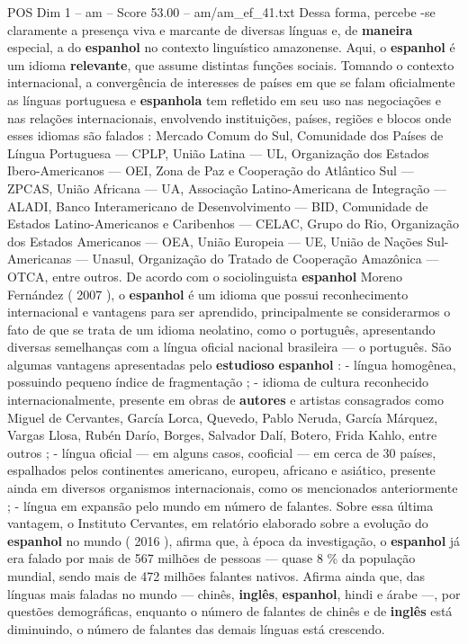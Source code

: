 \begin{textsample}{POS Dim 1 – am – Score 53.00 – am/am\_ef\_41.txt}
Dessa forma, percebe -se claramente a presença viva e marcante de diversas línguas e, de \textbf{maneira} especial, a do \textbf{espanhol} no contexto linguístico amazonense.
Aqui, o \textbf{espanhol} é um idioma \textbf{relevante}, que assume distintas funções sociais.
Tomando o contexto internacional, a convergência de interesses de países em que se falam oficialmente as línguas portuguesa e \textbf{espanhola} tem refletido em seu uso nas negociações e nas relações internacionais, envolvendo instituições, países, regiões e blocos onde esses idiomas são falados : Mercado Comum do Sul, Comunidade dos Países de Língua Portuguesa — CPLP, União Latina — UL, Organização dos Estados Ibero-Americanos — OEI, Zona de Paz e Cooperação do Atlântico Sul — ZPCAS, União Africana — UA, Associação Latino-Americana de Integração — ALADI, Banco Interamericano de Desenvolvimento — BID, Comunidade de Estados Latino-Americanos e Caribenhos — CELAC, Grupo do Rio, Organização dos Estados Americanos — OEA, União Europeia — UE, União de Nações Sul-Americanas — Unasul, Organização do Tratado de Cooperação Amazônica — OTCA, entre outros.
De acordo com o sociolinguista \textbf{espanhol} Moreno Fernández ( 2007 ), o \textbf{espanhol} é um idioma que possui reconhecimento internacional e vantagens para ser aprendido, principalmente se considerarmos o fato de que se trata de um idioma neolatino, como o português, apresentando diversas semelhanças com a língua oficial nacional brasileira — o português.
São algumas vantagens apresentadas pelo \textbf{estudioso} \textbf{espanhol} : - língua homogênea, possuindo pequeno índice de fragmentação ; - idioma de cultura reconhecido internacionalmente, presente em obras de \textbf{autores} e artistas consagrados como Miguel de Cervantes, García Lorca, Quevedo, Pablo Neruda, García Márquez, Vargas Llosa, Rubén Darío, Borges, Salvador Dalí, Botero, Frida Kahlo, entre outros ; - língua oficial — em alguns casos, cooficial — em cerca de 30 países, espalhados pelos continentes americano, europeu, africano e asiático, presente ainda em diversos organismos internacionais, como os mencionados anteriormente ; - língua em expansão pelo mundo em número de falantes.
Sobre essa última vantagem, o Instituto Cervantes, em relatório elaborado sobre a evolução do \textbf{espanhol} no mundo ( 2016 ), afirma que, à época da investigação, o \textbf{espanhol} já era falado por mais de 567 milhões de pessoas — quase 8 \% da população mundial, sendo mais de 472 milhões falantes nativos.
Afirma ainda que, das línguas mais faladas no mundo — chinês, \textbf{inglês}, \textbf{espanhol}, hindi e árabe —, por questões demográficas, enquanto o número de falantes de chinês e de \textbf{inglês} está diminuindo, o número de falantes das demais línguas está crescendo.

\end{textsample}
